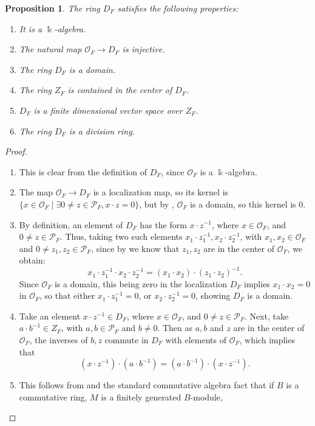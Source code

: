 \documentclass{amsart}
\newtheorem{prop}[equation]{Proposition}
\theoremstyle{definition}
\renewcommand{\k}{\Bbbk}
\numberwithin{equation}{section}
\begin{document}
\begin{prop}\label{prop:DFProp}
The ring $D_F$ satisfies the following properties:
\begin{enumerate}
\item It is a $\k$-algebra.
\item The natural map $\mathcal{O}_F \to D_F$ is injective.
\item The ring $D_F$ is a domain.
\item The ring $Z_F$ is contained in the center of $D_F$.
\item $D_F$ is a finite dimensional vector space over $Z_F$.
\item The ring $D_F$ is a division ring.
\end{enumerate}
\end{prop}
\begin{proof}\quad
\begin{enumerate}
\item This is clear from the definition of $D_F$,
since $\mathcal{O}_F$ is a $\k$-algebra.
\item The map $\mathcal{O}_F \to D_F$ is a localization map,
so its kernel is $\{x \in \mathcal{O}_F \mid \exists 0\ne z \in \mathcal{P}_F, x\cdot z =0\}$, but by , $\mathcal{O}_F$ is a domain, so this kernel is $0$.
\item By definition,
an element of $D_F$ has the form $x\cdot z^{-1}$,
where $x \in \mathcal{O}_F$, and $0 \ne z \in \mathcal{P}_F$.
Thus, taking two such elements $x_1\cdot z_1^{-1}, x_2 \cdot z_2^{-1}$,
with $x_1,x_2 \in \mathcal{O}_F$ and $0 \ne z_1,z_2 \in \mathcal{P}_F$,
since by  we know that $z_1, z_2$ are in the center of $\mathcal{O}_F$,
we obtain:
\[
x_1\cdot z_1^{-1} \cdot x_2\cdot z_2^{-1} = (x_1 \cdot x_2) \cdot (z_1 \cdot z_2)^{-1}.
\]
Since $\mathcal{O}_F$ is a domain,
this being zero in the localization $D_F$ implies $x_1\cdot x_2 = 0$ in $\mathcal{O}_F$, so that either $x_1\cdot z_1^{-1} = 0$,
or $x_2\cdot z_2^{-1} = 0$, showing $D_F$ is a domain.
\item Take an element $x\cdot z^{-1} \in D_F$, where $x \in \mathcal{O}_F$, and $0 \ne z \in \mathcal{P}_F$.
Next, take $a\cdot b^{-1} \in Z_F$,
with $a,b \in \mathcal{P}_F$ and $b \ne 0$.
Then as $a,b$ and $z$ are in the center of $\mathcal{O}_F$,
the inverses of $b,z$ commute in $D_F$ with elements of $\mathcal{O}_F$,
which implies that
\[
(x\cdot z^{-1}) \cdot (a\cdot b^{-1}) =  (a\cdot b^{-1}) \cdot (x\cdot z^{-1}).
\]
\item This follows from  and the standard commutative algebra fact that if $B$ is a commutative ring, $M$ is a finitely generated $B$-module,

\end{enumerate}
\end{proof}
\end{document}
